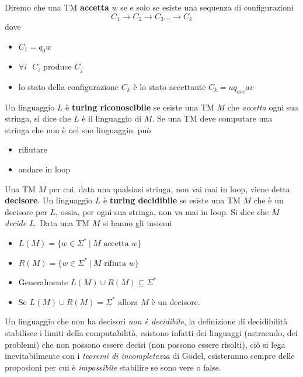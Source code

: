 \documentclass[10pt, letterpaper]{report}
\begin{document}
 Diremo che una TM \textbf{accetta} $w$ se e solo se esiste una sequenza di configurazioni 
 $$ C_1\rightarrow C_2\rightarrow C_3\dots\rightarrow C_k$$
 dove \begin{itemize}
    \item $C_1=q_0w$ 
    \item $\forall i \ \ \ C_i$ produce $C_j$
    \item lo stato della configurazione $C_k$ è lo stato accettante $C_k=uq_{acc}av$
 \end{itemize}
  Un linguaggio $L$ è \textbf{turing riconoscibile} se esiste una TM $M$ che 
 \textit{accetta} ogni sua stringa, si dice che $L$ è il linguaggio di $M$.\acc 
 Se una TM deve computare una stringa che non è nel suo linguaggio, può \begin{itemize}
    \item rifiutare 
    \item andare in loop
 \end{itemize}
 Una TM $M$ per cui, data una qualsiasi stringa, non vai mai in loop, viene detta \textbf{decisore}.\acc 
  Un linguaggio $L$ è \textbf{turing decidibile} se esiste una TM $M$ che è un 
 decisore per $L$, ossia, per ogni sua stringa, non va mai in loop. Si dice che $M$ \textit{decide} $L$.\acc 
Data una TM $M$ si hanno gli insiemi \begin{itemize}
    \item $L(M)=\{w\in\Sigma^* \ | \ M\text{ accetta }w \}$
    \item $R(M)=\{w\in\Sigma^* \ | \ M\text{ rifiuta }w \}$
    \item Generalmente $L(M)\cup R(M)\subseteq \Sigma^*$
    \item Se $L(M)\cup R(M)= \Sigma^*$ allora $M$ è un decisore.
 \end{itemize}
 Un linguaggio che non ha decisori \textit{non è decidibile}, la definizione di decidibilità stabilisce i limiti della 
 computabilità, esistono infatti dei linguaggi (astraendo, dei problemi) che non possono essere decisi (non possono essere 
 risolti), ciò si lega inevitabilmente con i \textit{teoremi di incompletezza} di Gödel, esisteranno sempre 
 delle proposioni per cui è \textit{impossibile} stabilire se sono vere o false. 
\end{document}
